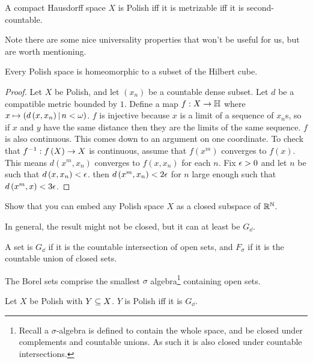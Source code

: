 \documentclass{amsart}
\begin{document}
\begin{lem}
A compact Hausdorff space $X$ is Polish iff it is metrizable iff it is
second-countable.
\end{lem}

Note there are some nice universality properties that won't be useful for us, but are
worth mentioning. 

\begin{prop}
Every Polish space is homeomorphic to a subset of the Hilbert cube.
\end{prop}

\begin{proof}
Let $X$ be Polish, and let $\left( x_n \right)$ be a countable dense subset. 
Let $d$ be a compatible metric bounded by $1$. Define a map $f:X\rightarrow \mathbb{H}$ where
$x\mapsto \left( d\left( x , x_n \right) \, \middle\vert \, n<\omega \right)$. 
$f$ is injective because $x$ is a limit of a sequence of $x_n$s, so if $x$ and $y$ have
the same distance then they are the limits of the same sequence. 
$f$ is also continuous. This comes down to an argument on one coordinate. 
To check that $f^{-1}:f\left( X \right) \rightarrow X$ is continuous, assume that $f\left(
x^m \right)$ converges to $f\left( x \right)$.
This means $d\left( x^m , x_n \right)$ converges to $f\left( x , x_n \right)$ for each
$n$.
Fix $\epsilon > 0$ and let $n$ be such that $d\left( x , x_n \right) < \epsilon$. 
then $d\left( x^m , x_n \right) < 2\epsilon$ for $n$ large enough such that $d\left( x^m , x
\right) < 3\epsilon$.
\end{proof}

\begin{exr}
Show that you can embed any Polish space $X$ as a closed subspace of $\mathbb{R}^{\mathbb{N}}$. 
\end{exr}

In general, the result might not be closed, but it can at least be $G_\dd$. 

\begin{defn}
A set is $G_\dd$ if it is the countable intersection of open sets, and $F_\sigma$
if it is the countable union of closed sets.
\end{defn}

The Borel sets comprise the smallest $\sigma$ algebra\footnote{Recall a $\sigma$-algebra
is defined to contain the whole space, and be closed under complements and countable
unions. As such it is also closed
under countable intersections.} containing open sets. 

\begin{prop}
Let $X$ be Polish with $Y\subseteq X$. 
$Y$ is Polish iff it is $G_\dd$.
\end{prop}
\end{document}
